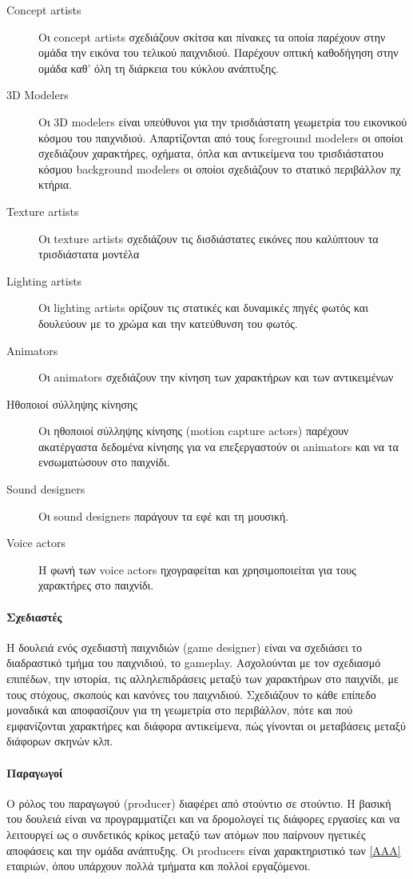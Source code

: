 	\begin{description}
		\item [Concept artists] 
		Οι concept artists σχεδιάζουν σκίτσα και πίνακες τα οποία παρέχουν στην ομάδα την εικόνα του τελικού παιχνιδιού. Παρέχουν οπτική καθοδήγηση στην ομάδα καθ' όλη τη διάρκεια του κύκλου ανάπτυξης.
		\item [3D Modelers]
	    Οι 3D modelers είναι υπεύθυνοι για την τρισδιάστατη γεωμετρία του εικονικού κόσμου του παιχνιδιού. Απαρτίζονται από τους
		foreground modelers οι οποίοι σχεδιάζουν χαρακτήρες, οχήματα, όπλα και αντικείμενα του τρισδιάστατου κόσμου
		background modelers οι οποίοι σχεδιάζουν το στατικό περιβάλλον πχ κτήρια.
		\item [Texture artists] Οι texture artists σχεδιάζουν τις δισδιάστατες εικόνες που καλύπτουν τα τρισδιάστατα μοντέλα
		\item [Lighting artists] Οι lighting artists ορίζουν τις στατικές και δυναμικές πηγές φωτός και δουλεύουν με το χρώμα και την κατεύθυνση του φωτός.
		\item [Animators] Οι animators σχεδιάζουν την κίνηση των χαρακτήρων και των αντικειμένων
		\item [Hθοποιοί σύλληψης κίνησης] Οι ηθοποιοί σύλληψης κίνησης (motion capture actors) παρέχουν ακατέργαστα δεδομένα κίνησης για να επεξεργαστούν οι animators και να τα ενσωματώσουν στο παιχνίδι.
		\item [Sound designers] Οι sound designers παράγουν τα εφέ και τη μουσική.
		\item [Voice actors] H φωνή των voice actors ηχογραφείται και χρησιμοποιείται για τους χαρακτήρες στο παιχνίδι.
	\end{description}
	
	\paragraph{Σχεδιαστές}
	Η δουλειά ενός σχεδιαστή παιχνιδιών (game designer) είναι να σχεδιάσει το διαδραστικό τμήμα του παιχνιδιού, το gameplay. Ασχολούνται με τον σχεδιασμό επιπέδων, την ιστορία, τις αλληλεπιδράσεις μεταξύ των χαρακτήρων στο παιχνίδι, με τους στόχους, σκοπούς και κανόνες του παιχνιδιού.
	Σχεδιάζουν το κάθε επίπεδο μοναδικά και αποφασίζουν για τη γεωμετρία στο περιβάλλον, πότε και πού εμφανίζονται χαρακτήρες και διάφορα αντικείμενα, πώς γίνονται οι μεταβάσεις μεταξύ διάφορων σκηνών κλπ.
	
	\paragraph{Παραγωγοί}
	Ο ρόλος του παραγωγού (producer) διαφέρει από στούντιο σε στούντιο. Η βασική του δουλειά είναι να προγραμματίζει και να δρομολογεί τις διάφορες εργασίες και να λειτουργεί ως ο συνδετικός κρίκος μεταξύ των ατόμων που παίρνουν ηγετικές αποφάσεις και την ομάδα ανάπτυξης. Οι producers είναι χαρακτηριστικό των \ref{ΑΑΑ} εταιριών, όπου υπάρχουν πολλά τμήματα και πολλοί εργαζόμενοι.	
	
